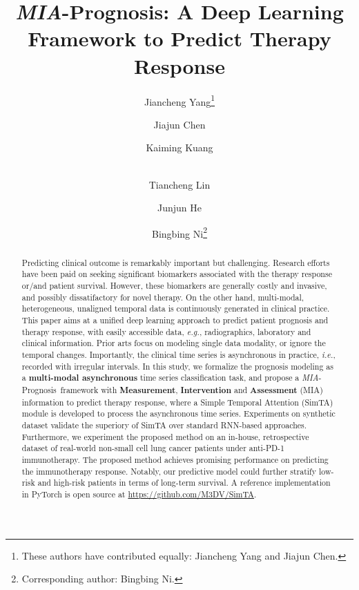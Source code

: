 \documentclass[runningheads]{llncs}
\newcommand{\ie}{\textit{i.e.}}
\newcommand{\eg}{\textit{e.g.}}
\newcommand{\miap}{\emph{MIA}-Prognosis}
\begin{document}
\title{\miap: A Deep Learning Framework to Predict Therapy Response}
\titlerunning{\miap: A Framework to Predict Therapy Response}

\author{Jiancheng Yang\thanks{These authors have contributed equally: Jiancheng Yang and Jiajun Chen.}  \and Jiajun Chen \and Kaiming Kuang\and  \\
Tiancheng Lin \and Junjun He  \and Bingbing Ni\thanks{Corresponding author: Bingbing Ni.}}




\maketitle              \begin{abstract}
	Predicting clinical outcome is remarkably important but challenging. Research efforts have been paid on seeking significant biomarkers associated with the 
	therapy response or/and patient survival. However, these biomarkers are generally costly and invasive, and possibly dissatifactory for novel therapy. On the other hand, multi-modal, heterogeneous, unaligned temporal data is continuously generated in clinical practice. This paper aims at a unified deep learning approach to predict patient prognosis and therapy response, with easily accessible data, \eg, radiographics, laboratory and clinical information. Prior arts focus on modeling single data modality, or ignore the temporal changes. Importantly, the clinical time series is asynchronous in practice, \ie, recorded with irregular intervals. In this study, we formalize the prognosis modeling as a \textbf{multi-modal asynchronous} time series classification task, and propose a \miap~framework with \textbf{Measurement}, \textbf{Intervention} and \textbf{Assessment} (MIA) information to predict therapy response, where a Simple Temporal Attention (SimTA) module is developed to process the asynchronous time series. Experiments on synthetic dataset validate the superiory of SimTA over standard RNN-based approaches. Furthermore, we experiment the proposed method on an in-house, retrospective dataset of real-world non-small cell lung cancer patients under anti-PD-1 immunotherapy. The proposed method achieves promising performance on predicting the immunotherapy response. Notably, our predictive model could further stratify low-risk and high-risk patients in terms of long-term survival. A reference implementation in PyTorch is open source at \url{https://github.com/M3DV/SimTA}.

\end{abstract}
\end{document}
